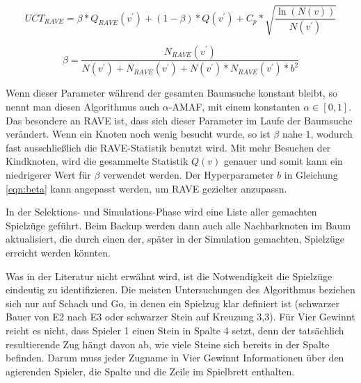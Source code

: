\medskip
\begin{equation}
UCT_{RAVE}=\beta * Q_{RAVE}(v^\prime) + (1-\beta) * Q(v^\prime) + C_p * \sqrt{\frac{\ln(N(v))}{N(v^\prime)}}
\label{eqn:uct-rave}
\end{equation}

\begin{equation}
\beta = \frac{N_{RAVE}(v^\prime)}{N(v^\prime)+N_{RAVE}(v^\prime)+N(v^\prime)*N_{RAVE}(v^\prime)*b^2}
\label{eqn:beta}
\end{equation}


\medskip
Wenn dieser Parameter während der gesamten Baumsuche konstant bleibt, so nennt man diesen Algorithmus auch $\alpha$-AMAF, mit einem konstanten $\alpha \in [0,1]$. Das besondere an RAVE ist, dass sich dieser Parameter im Laufe der Baumsuche verändert. Wenn ein Knoten noch wenig besucht wurde, so ist $\beta$ nahe $1$, wodurch fast ausschließlich die RAVE-Statistik benutzt wird. Mit mehr Besuchen der Kindknoten, wird die gesammelte Statistik $Q(v)$ genauer und somit kann ein niedrigerer Wert für $\beta$ verwendet werden. Der Hyperparameter $b$ in Gleichung \ref{eqn:beta} kann angepasst werden, um RAVE gezielter anzupassn.

In der Selektions- und Simulations-Phase wird eine Liste aller gemachten Spielzüge geführt. Beim Backup werden dann auch alle Nachbarknoten im Baum aktualisiert, die durch einen der, später in der Simulation gemachten, Spielzüge erreicht werden könnten.

Was in der Literatur nicht erwähnt wird, ist die Notwendigkeit die Spielzüge eindeutig zu identifizieren. Die meisten Untersuchungen des Algorithmus beziehen sich nur auf Schach und Go, in denen ein Spielzug klar definiert ist (schwarzer Bauer von E2 nach E3 oder schwarzer Stein auf Kreuzung 3,3).
Für Vier Gewinnt reicht es nicht, dass Spieler 1 einen Stein in Spalte 4 setzt, denn der tatsächlich resultierende Zug hängt davon ab, wie viele Steine sich bereits in der Spalte befinden. Darum muss jeder Zugname in Vier Gewinnt Informationen über den agierenden Spieler, die Spalte und die Zeile im Spielbrett enthalten.

